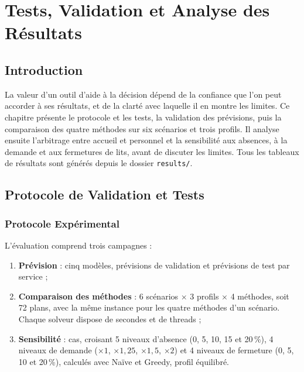\chapter{Tests, Validation et Analyse des Résultats}
\label{ch:tests_validation_resultats}

\section*{Introduction}
La valeur d'un outil d'aide à la décision dépend de la confiance que l'on peut accorder à ses résultats, et de la clarté avec laquelle il en montre les limites. Ce chapitre présente le protocole et les tests, la validation des prévisions, puis la comparaison des quatre méthodes sur six scénarios et trois profils. Il analyse ensuite l'arbitrage entre accueil et personnel et la sensibilité aux absences, à la demande et aux fermetures de lits, avant de discuter les limites. Tous les tableaux de résultats sont générés depuis le dossier \texttt{results/}.

\section{Protocole de Validation et Tests}

\subsection{Protocole Expérimental}
L'évaluation comprend trois campagnes :
\begin{enumerate}
    \item \textbf{Prévision} : cinq modèles, \NbPrevVal{} prévisions de validation et \NbPrevTest{} prévisions de test par service ;
    \item \textbf{Comparaison des méthodes} : 6 scénarios $\times$ 3 profils $\times$ 4 méthodes, soit 72 plans, avec la même instance pour les quatre méthodes d'un scénario. Chaque solveur dispose de \TempsSolveur{} secondes et de \ThreadsSolveur{} threads ;
    \item \textbf{Sensibilité} : \NbCas{} cas, croisant 5 niveaux d'absence (0, 5, 10, 15 et 20\,\%), 4 niveaux de demande ($\times 1$, $\times 1{,}25$, $\times 1{,}5$, $\times 2$) et 4 niveaux de fermeture (0, 5, 10 et 20\,\%), calculés avec Naïve et Greedy, profil équilibré.
\end{enumerate}

